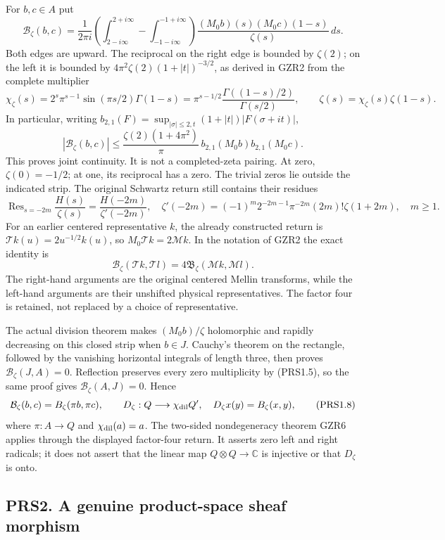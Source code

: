 For \(b,c\in A\) put \[
\mathcal B_\zeta(b,c)=\frac1{2\pi i}
\left(\int_{2-i\infty}^{2+i\infty}-\int_{-1-i\infty}^{-1+i\infty}\right)
\frac{(M_0b)(s)(M_0c)(1-s)}{\zeta(s)}\,ds.
\tag{PRS1.4}
\] Both edges are upward. The reciprocal on the right edge is bounded by
\(\zeta(2)\); on the left it is bounded by
\(4\pi^2\zeta(2)(1+|t|)^{-3/2}\), as derived in GZR2 from the complete
multiplier \[
\chi_\zeta(s)=2^s\pi^{s-1}\sin(\pi s/2)\Gamma(1-s)
=\pi^{s-1/2}\frac{\Gamma((1-s)/2)}{\Gamma(s/2)},\qquad
\zeta(s)=\chi_\zeta(s)\zeta(1-s).
\tag{PRS1.5}
\] In particular, writing
\(b_{2,1}(F)=\sup_{|\sigma|\leq2,t}(1+|t|)|F(\sigma+it)|\), \[
|\mathcal B_\zeta(b,c)|\leq
\frac{\zeta(2)(1+4\pi^2)}{\pi}\,b_{2,1}(M_0b)b_{2,1}(M_0c).
\tag{PRS1.6}
\] This proves joint continuity. It is not a completed-zeta pairing. At
zero, \(\zeta(0)=-1/2\); at one, its reciprocal has a zero. The trivial
zeros lie outside the indicated strip. The original Schwartz return
still contains their residues \[
\operatorname{Res}_{s=-2m}\frac{H(s)}{\zeta(s)}=\frac{H(-2m)}{\zeta'(-2m)},\quad
\zeta'(-2m)=(-1)^m2^{-2m-1}\pi^{-2m}(2m)!\zeta(1+2m),\quad m\geq1.
\tag{PRS1.7}
\] For an earlier centered representative \(k\), the already constructed
return is \(\mathcal Tk(u)=2u^{-1/2}k(u)\), so
\(M_0\mathcal Tk=2\mathcal Mk\). In the notation of GZR2 the exact
identity is \[
\mathcal B_\zeta(\mathcal Tk,\mathcal Tl)=4\mathfrak B_\zeta(\mathcal Mk,\mathcal Ml).
\] The right-hand arguments are the original centered Mellin transforms,
while the left-hand arguments are their unshifted physical
representatives. The factor four is retained, not replaced by a choice
of representative.

The actual division theorem makes \((M_0b)/\zeta\) holomorphic and
rapidly decreasing on this closed strip when \(b\in J\). Cauchy's
theorem on the rectangle, followed by the vanishing horizontal integrals
of length three, then proves \(\mathcal B_\zeta(J,A)=0\). Reflection
preserves every zero multiplicity by (PRS1.5), so the same proof gives
\(\mathcal B_\zeta(A,J)=0\). Hence \[
\mathcal B_\zeta(b,c)=B_\zeta(\pi b,\pi c),\qquad
D_\zeta:Q\longrightarrow\chi_{\rm dil}Q',\quad D_\zeta x(y)=B_\zeta(x,y),
\tag{PRS1.8}
\] where \(\pi:A\to Q\) and \(\chi_{\rm dil}(a)=a\). The two-sided
nondegeneracy theorem GZR6 applies through the displayed factor-four
return. It asserts zero left and right radicals; it does not assert that
the linear map \(Q\otimes Q\to\mathbb C\) is injective or that
\(D_\zeta\) is onto.

\subsection{PRS2. A genuine product-space sheaf
morphism}\label{prs2.-a-genuine-product-space-sheaf-morphism}

